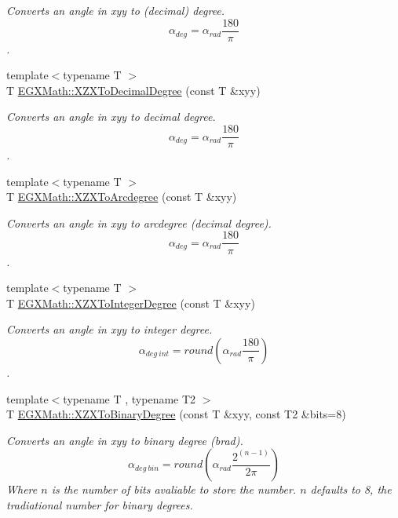 \begin{DoxyCompactItemize}
\begin{DoxyCompactList}\small\item\em Converts an angle in xyy to (decimal) degree. \[\alpha_{deg}=\alpha_{rad}\frac{180}{\pi}\]. \end{DoxyCompactList}\item 
{\footnotesize template$<$typename T $>$ }\\T \mbox{\hyperlink{group___e_g_x_math-_angle_conversions-_x_z_x_ga34889b101a1069ca94a6b899fb98d271}{E\+G\+X\+Math\+::\+X\+Z\+X\+To\+Decimal\+Degree}} (const T \&xyy)
\begin{DoxyCompactList}\small\item\em Converts an angle in xyy to decimal degree. \[\alpha_{deg}=\alpha_{rad}\frac{180}{\pi}\]. \end{DoxyCompactList}\item 
{\footnotesize template$<$typename T $>$ }\\T \mbox{\hyperlink{group___e_g_x_math-_angle_conversions-_x_z_x_gade03c99ea870f58dcebd6307beed2364}{E\+G\+X\+Math\+::\+X\+Z\+X\+To\+Arcdegree}} (const T \&xyy)
\begin{DoxyCompactList}\small\item\em Converts an angle in xyy to arcdegree (decimal degree). \[\alpha_{deg}=\alpha_{rad}\frac{180}{\pi}\]. \end{DoxyCompactList}\item 
{\footnotesize template$<$typename T $>$ }\\T \mbox{\hyperlink{group___e_g_x_math-_angle_conversions-_x_z_x_ga0299d21c268bd32475c8fbf574fe357b}{E\+G\+X\+Math\+::\+X\+Z\+X\+To\+Integer\+Degree}} (const T \&xyy)
\begin{DoxyCompactList}\small\item\em Converts an angle in xyy to integer degree. \[\alpha_{deg\ int}=round(\alpha_{rad}\frac{180}{\pi})\]. \end{DoxyCompactList}\item 
{\footnotesize template$<$typename T , typename T2 $>$ }\\T \mbox{\hyperlink{group___e_g_x_math-_angle_conversions-_x_z_x_ga245f7fe63a1fec3b66d44f5ad07abc72}{E\+G\+X\+Math\+::\+X\+Z\+X\+To\+Binary\+Degree}} (const T \&xyy, const T2 \&bits=8)
\begin{DoxyCompactList}\small\item\em Converts an angle in xyy to binary degree (brad). \[\alpha_{deg\ bin}=round(\alpha_{rad}\frac{2^{(n-1)}}{2 \pi})\] Where $n$ is the number of bits avaliable to store the number. $n$ defaults to 8, the tradiational number for binary degrees. \end{DoxyCompactList}\item 

\end{DoxyCompactItemize}
